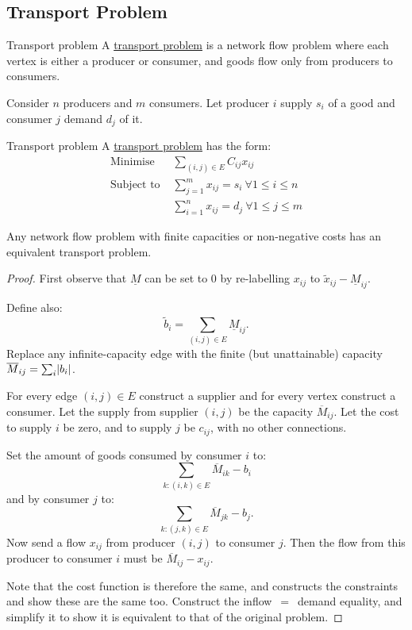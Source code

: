 \documentclass[../Main.tex]{subfiles}
\begin{document}
\subsection{Transport Problem}
\begin{definition}{Transport problem}
    A \underline{transport problem} is a network flow problem where each vertex is either a producer or consumer, and goods flow only from producers to consumers.
\end{definition}
Consider $n$ producers and $m$ consumers. Let producer $i$ supply $s_i$ of a good and consumer $j$ demand $d_j$ of it.
\begin{definition}{Transport problem}
    A \underline{transport problem} has the form:
    \begin{align*}
        \text{Minimise } & \sum_{(i, j) \in E} C_{ij} x_{ij} \\
        \text{Subject to } & \sum_{j=1}^{m} x_{ij} = s_i~\forall 1 \leq i \leq n \\
        & \sum_{i=1}^{n} x_{ij} = d_j~\forall 1 \leq j \leq m
    \end{align*}
\end{definition}
\begin{theorem}
    Any network flow problem with finite capacities or non-negative costs has an equivalent transport problem.
    \label{thmTransportNetFlowEquiv}
\end{theorem}
\begin{proof}
    First observe that $\underline{M}$ can be set to $0$ by re-labelling $x_{ij}$ to $\tilde{x}_{ij} - \underline{M}_{ij}$.

    Define also:
    \begin{equation*}
        \tilde{b}_i = \sum_{(i, j)\in E} \underline{M}_{ij}.
    \end{equation*}
    Replace any infinite-capacity edge with the finite (but unattainable) capacity $\overline{M}_{ij} = \sum_i \lvert b_i\rvert$.

    For every edge $(i, j) \in E$ construct a supplier and for every vertex construct a consumer. Let the supply from supplier $(i, j)$ be the capacity $\overline{M}_{ij}$. Let the cost to supply $i$ be zero, and to supply $j$ be $c_{ij}$, with no other connections.

    Set the amount of goods consumed by consumer $i$ to:
    \begin{equation*}
        \sum_{k : (i, k) \in E} \overline{M}_{ik} - b_i
    \end{equation*}
    and by consumer $j$ to:
    \begin{equation*}
        \sum_{k : (j, k) \in E} \overline{M}_{jk} - b_j.
    \end{equation*}
    Now send a flow $x_{ij}$ from producer $(i, j)$ to consumer $j$. Then the flow from this producer to consumer $i$ must be $\overline{M}_{ij} - x_{ij}$.

    Note that the cost function is therefore the same, and constructs the constraints and show these are the same too. Construct the inflow~$=$~demand equality, and simplify it to show it is equivalent to that of the original problem.
\end{proof}
\end{document}
